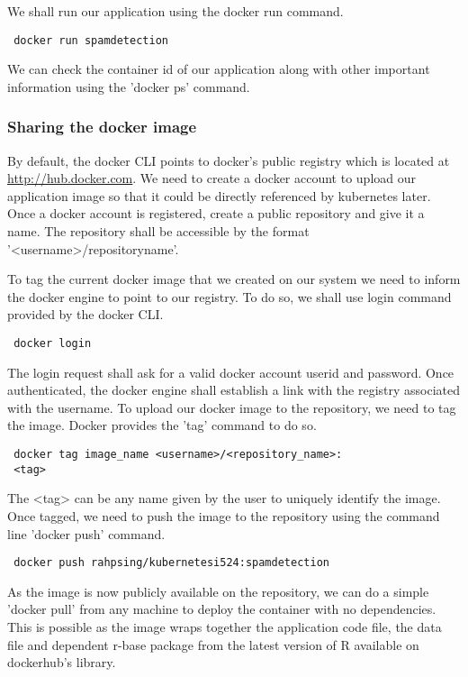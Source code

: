 \documentclass[9pt,twocolumn,twoside]{../../styles/osajnl}
\begin{document}
We shall run our application using the docker run command.

\begin{verbatim}
 docker run spamdetection
\end{verbatim}

We can check the container id of our application along with other
important information using the 'docker ps' command.
 
\subsubsection{Sharing the docker image}

By default, the docker CLI points to docker's public registry which is
located at \url{http://hub.docker.com}. We need to create a docker
account to upload our application image so that it could be directly
referenced by kubernetes later. Once a docker account is registered,
create a public repository and give it a name. The repository shall be
accessible by the format '<username>/repositoryname'.

To tag the current docker image that we created on our system we need
to inform the docker engine to point to our registry. To do so, we
shall use login command provided by the docker CLI.

\begin{verbatim}
 docker login
\end{verbatim}

The login request shall ask for a valid docker account userid and
password. Once authenticated, the docker engine shall establish a link
with the registry associated with the username.  To upload our docker
image to the repository, we need to tag the image. Docker provides the
'tag' command to do so.

\begin{verbatim}
 docker tag image_name <username>/<repository_name>:
 <tag>
\end{verbatim}

The <tag> can be any name given by the user to uniquely identify the
image. Once tagged, we need to push the image to the repository using
the command line 'docker push' command.

\begin{verbatim}
 docker push rahpsing/kubernetesi524:spamdetection
\end{verbatim}

As the image is now publicly available on the repository, we can do a
simple 'docker pull' from any machine to deploy the container with no
dependencies. This is possible as the image wraps together the
application code file, the data file and dependent r-base package from
the latest version of R available on dockerhub's library.
\end{document}

